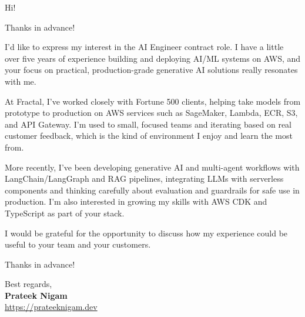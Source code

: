 \documentclass[letterpaper,10pt]{moderncv}
\begin{document}
\date{\today}
\opening{Hi!}
\closing{Thanks in advance!}
\makelettertitle

I'd like to express my interest in the AI Engineer contract role. I have a little over five years of experience building and deploying AI/ML systems on AWS, and your focus on practical, production-grade generative AI solutions really resonates with me.

At Fractal, I've worked closely with Fortune 500 clients, helping take models from prototype to production on AWS services such as SageMaker, Lambda, ECR, S3, and API Gateway. I'm used to small, focused teams and iterating based on real customer feedback, which is the kind of environment I enjoy and learn the most from.

More recently, I've been developing generative AI and multi-agent workflows with LangChain/LangGraph and RAG pipelines, integrating LLMs with serverless components and thinking carefully about evaluation and guardrails for safe use in production. I'm also interested in growing my skills with AWS CDK and TypeScript as part of your stack.

I would be grateful for the opportunity to discuss how my experience could be useful to your team and your customers.

\vspace{0.5cm}
Thanks in advance!

\vspace{0.5cm}
Best regards, \\

\textbf{Prateek Nigam} \\
\href{https://prateeknigam.dev/}{https://prateeknigam.dev}\\
\end{document}

